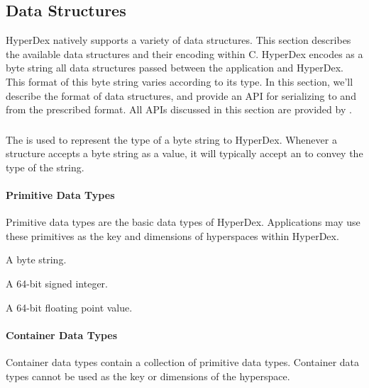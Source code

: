 \subsection{Data Structures}

HyperDex natively supports a variety of data structures.  This section describes
the available data structures and their encoding within C.  HyperDex encodes as
a byte string all data structures passed between the application and HyperDex.
This format of this byte string varies according to its type.  In this section,
we'll describe the format of data structures, and provide an API for serializing
to and from the prescribed format.  All APIs discussed in this section are
provided by .

\subsubsection{}

The  is used to represent the type of a byte string to
HyperDex.  Whenever a structure accepts a byte string as a value, it will
typically accept an  to convey the type of the string.

\paragraph{Primitive Data Types}

Primitive data types are the basic data types of HyperDex.  Applications may use
these primitives as the key and dimensions of hyperspaces within HyperDex.

\begin{description}[noitemsep]
\item[\code{HYPERDATATYPE\_STRING}] A byte string.
\item[\code{HYPERDATATYPE\_INT64}] A 64-bit signed integer.
\item[\code{HYPERDATATYPE\_FLOAT}] A 64-bit floating point value.
\end{description}

\paragraph{Container Data Types}

Container data types contain a collection of primitive data types.  Container
data types cannot be used as the key or dimensions of the hyperspace.

